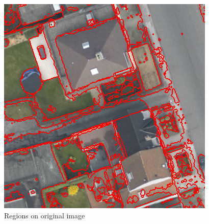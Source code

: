 \documentclass{beamer}
\begin{document}
\begin{frame}
\begin{figure}[ht]
\begin{minipage}[b]{0.45\linewidth}
      \includegraphics[width=\textwidth]{./Images/DFC2015/MBO/imWithBorders.png}
      \caption{Regions on original image}
    \end{minipage}
  \end{figure}
\end{frame}

\end{document}
